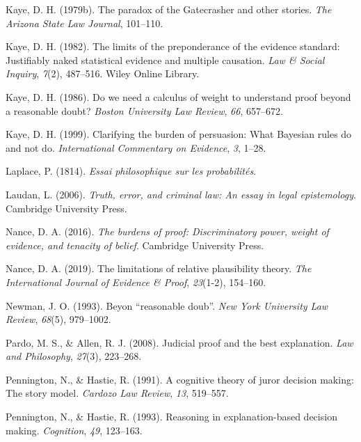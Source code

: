 \documentclass[10pt,dvipsnames]{scrartcl}
\begin{document}
\leavevmode\hypertarget{ref-Kaye79gate}{}%
Kaye, D. H. (1979b). The paradox of the Gatecrasher and other stories.
\emph{The Arizona State Law Journal}, 101--110.

\leavevmode\hypertarget{ref-kaye1982limits}{}%
Kaye, D. H. (1982). The limits of the preponderance of the evidence
standard: Justifiably naked statistical evidence and multiple causation.
\emph{Law \& Social Inquiry}, \emph{7}(2), 487--516. Wiley Online
Library.

\leavevmode\hypertarget{ref-Kaye1986Do}{}%
Kaye, D. H. (1986). Do we need a calculus of weight to understand proof
beyond a reasonable doubt? \emph{Boston University Law Review},
\emph{66}, 657--672.

\leavevmode\hypertarget{ref-Kaye1999clarifying}{}%
Kaye, D. H. (1999). Clarifying the burden of persuasion: What Bayesian
rules do and not do. \emph{International Commentary on Evidence},
\emph{3}, 1--28.

\leavevmode\hypertarget{ref-Laplace1814}{}%
Laplace, P. (1814). \emph{Essai philosophique sur les probabilités}.

\leavevmode\hypertarget{ref-laudan2006truth}{}%
Laudan, L. (2006). \emph{Truth, error, and criminal law: An essay in
legal epistemology}. Cambridge University Press.

\leavevmode\hypertarget{ref-nance2016}{}%
Nance, D. A. (2016). \emph{The burdens of proof: Discriminatory power,
weight of evidence, and tenacity of belief}. Cambridge University Press.

\leavevmode\hypertarget{ref-nance2019LimitationsRelativePlausibility}{}%
Nance, D. A. (2019). The limitations of relative plausibility theory.
\emph{The International Journal of Evidence \& Proof}, \emph{23}(1-2),
154--160.

\leavevmode\hypertarget{ref-newman1993}{}%
Newman, J. O. (1993). Beyon ``reasonable doub''. \emph{New York
University Law Review}, \emph{68}(5), 979--1002.

\leavevmode\hypertarget{ref-Pardo2008judicial}{}%
Pardo, M. S., \& Allen, R. J. (2008). Judicial proof and the best
explanation. \emph{Law and Philosophy}, \emph{27}(3), 223--268.

\leavevmode\hypertarget{ref-Pennington1991}{}%
Pennington, N., \& Hastie, R. (1991). A cognitive theory of juror
decision making: The story model. \emph{Cardozo Law Review}, \emph{13},
519--557.

\leavevmode\hypertarget{ref-penn1993}{}%
Pennington, N., \& Hastie, R. (1993). Reasoning in explanation-based
decision making. \emph{Cognition}, \emph{49}, 123--163.
\end{document}
